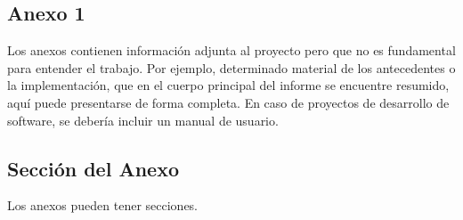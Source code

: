 \documentclass{prgrado}
\begin{document}
\begin{appendix}

\chapter{Anexo 1}

Los anexos contienen información adjunta al proyecto pero que no es fundamental
para entender el trabajo. Por ejemplo, determinado material de los antecedentes o la
implementación, que en el cuerpo principal del informe se encuentre resumido, aquí
puede presentarse de forma completa. En caso de proyectos de desarrollo de
software, se debería incluir un manual de usuario.

\section{Sección del Anexo}

Los anexos pueden tener secciones.

\end{appendix}


\end{document}

